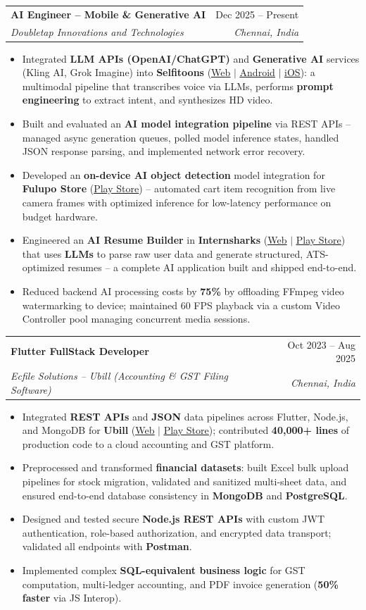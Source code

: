 \documentclass[letterpaper,10pt]{article}
\makeatletter
\newcommand{\resumeItem}[1]{\item\small{{#1 \vspace{-2pt}}}}
\newcommand{\resumeSubheading}[4]{
  \vspace{-2pt}\item
    \begin{tabular*}{0.97\textwidth}[t]{l@{\extracolsep{\fill}}r}
      \textbf{#1} & #2 \\
      \textit{\small#3} & \textit{\small #4} \\
    \end{tabular*}\vspace{-7pt}
}
\newcommand{\resumeItemListStart}{\begin{itemize}}
\newcommand{\resumeItemListEnd}{\end{itemize}\vspace{-5pt}}
\makeatother
\begin{document}
    \resumeSubheading
      {AI Engineer -- Mobile \& Generative AI}{Dec 2025 -- Present}
      {Doubletap Innovations and Technologies}{Chennai, India}
      \resumeItemListStart
        \resumeItem{Integrated \textbf{LLM APIs (OpenAI/ChatGPT)} and \textbf{Generative AI} services (Kling AI, Grok Imagine) into \textbf{Selfitoons} (\href{https://selfitoons.ai/}{\underline{Web}} $|$ \href{https://play.google.com/store/apps/details?id=com.doubletap.ai.selfitoons}{\underline{Android}} $|$ \href{https://apps.apple.com/in/app/selfitoons/id6758597947}{\underline{iOS}}): a multimodal pipeline that transcribes voice via LLMs, performs \textbf{prompt engineering} to extract intent, and synthesizes HD video.}
        \resumeItem{Built and evaluated an \textbf{AI model integration pipeline} via REST APIs -- managed async generation queues, polled model inference states, handled JSON response parsing, and implemented network error recovery.}
        \resumeItem{Developed an \textbf{on-device AI object detection} model integration for \textbf{Fulupo Store} (\href{https://play.google.com/store/apps/details?id=com.doubletap.fulupostore}{\underline{Play Store}}) -- automated cart item recognition from live camera frames with optimized inference for low-latency performance on budget hardware.}
        \resumeItem{Engineered an \textbf{AI Resume Builder} in \textbf{Internsharks} (\href{https://internsharks.ai/}{\underline{Web}} $|$ \href{https://play.google.com/store/apps/details?id=com.doubletap.internsharks.ai}{\underline{Play Store}}) that uses \textbf{LLMs} to parse raw user data and generate structured, ATS-optimized resumes -- a complete AI application built and shipped end-to-end.}
        \resumeItem{Reduced backend AI processing costs by \textbf{75\%} by offloading FFmpeg video watermarking to device; maintained 60 FPS playback via a custom Video Controller pool managing concurrent media sessions.}
      \resumeItemListEnd

    \resumeSubheading
      {Flutter FullStack Developer}{Oct 2023 -- Aug 2025}
      {Ecfile Solutions -- Ubill (Accounting \& GST Filing Software)}{Chennai, India}
      \resumeItemListStart
        \resumeItem{Integrated \textbf{REST APIs} and \textbf{JSON} data pipelines across Flutter, Node.js, and MongoDB for \textbf{Ubill} (\href{https://app.ubill.tech/}{\underline{Web}} $|$ \href{https://play.google.com/store/apps/details?id=com.ubill.tech}{\underline{Play Store}}); contributed \textbf{40,000+ lines} of production code to a cloud accounting and GST platform.}
        \resumeItem{Preprocessed and transformed \textbf{financial datasets}: built Excel bulk upload pipelines for stock migration, validated and sanitized multi-sheet data, and ensured end-to-end database consistency in \textbf{MongoDB} and \textbf{PostgreSQL}.}
        \resumeItem{Designed and tested secure \textbf{Node.js REST APIs} with custom JWT authentication, role-based authorization, and encrypted data transport; validated all endpoints with \textbf{Postman}.}
        \resumeItem{Implemented complex \textbf{SQL-equivalent business logic} for GST computation, multi-ledger accounting, and PDF invoice generation (\textbf{50\% faster} via JS Interop).}
      \resumeItemListEnd
\end{document}
